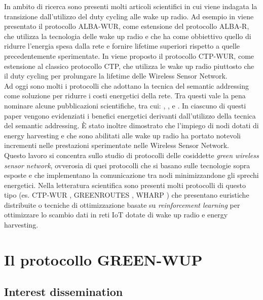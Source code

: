 \documentclass[binding=0.6cm,TFA]{sapthesis}
\begin{document}
In ambito di ricerca sono presenti molti articoli scientifici in cui viene indagata la transizione dall'utilizzo del duty cycling alle wake up radio. Ad esempio
in \cite{beyond-duty-cycling-paper} viene presentato il protocollo ALBA-WUR, come estensione del protocollo ALBA-R, che utilizza la tecnologia delle wake up radio
e che ha come obbiettivo quello di ridurre l'energia spesa dalla rete e fornire lifetime superiori rispetto a quelle precedentemente sperimentate. In
\cite{ctp-wur-paper} viene proposto il protocollo CTP-WUR, come estensione al classico protocollo CTP, che utilizza le wake up radio piuttosto che il
duty cycling per prolungare la lifetime delle Wireless Sensor Network.\\

Ad oggi sono molti i protocolli che adottano la tecnica del semantic addressing come soluzione per ridurre i costi energetici della rete. Tra questi
vale la pena nominare alcune pubblicazioni scientifiche, tra cui: \cite{novel-wake-up-receiver-paper}, \cite{beyond-duty-cycling-paper}, e \cite{ctp-wur-paper}.
In ciascuno di questi paper vengono evidenziati i benefici energetici derivanti dall'utilizzo della tecnica del semantic addressing. È stato inoltre
dimostrato che l'impiego di nodi dotati di energy harvesting \cite{energy-harvesting-paper} e che sono abilitati alle wake up radio
\cite{wake-up-radios-paper} ha portato notevoli incrementi nelle prestazioni sperimentate nelle Wireless Sensor Network.\\

Questo lavoro si concentra sullo studio di protocolli delle cosiddette \emph{green wireless sensor network}, ovverosia di quei protocolli che si basano
sulle tecnologie sopra esposte e che implementano la comunicazione tra nodi minimizzandone gli sprechi energetici. Nella letteratura scientifica
sono presenti molti protocolli di questo tipo (es. CTP-WUR \cite{ctp-wur-paper}, GREENROUTES \cite{wake-up-radios-paper}, WHARP \cite{wharp-paper}) che
presentano euristiche distribuite o tecniche di ottimizzazione basate su \emph{reinforcement learning} per ottimizzare lo scambio dati in reti IoT dotate di wake
up radio e energy harvesting.

\chapter{Il protocollo GREEN-WUP}

\section{Interest dissemination}
\end{document}
